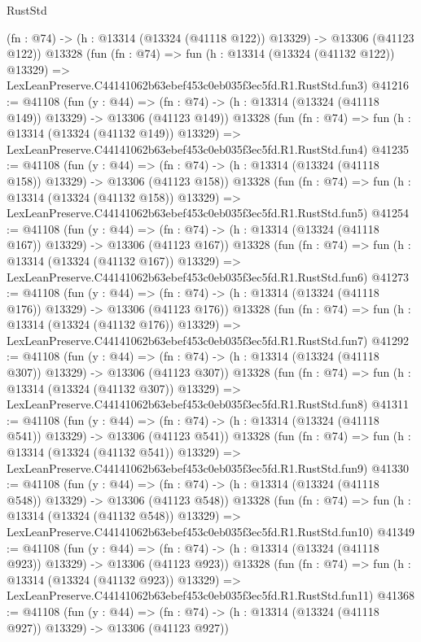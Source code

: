 \begin{lexlean}{RustStd}
\begin{coremodule}
    (fn : @74) -> (h : @13314 (@13324 (@41118 @122)) @13329) -> @13306 (@41123 @122))
    @13328
    (fun (fn : @74) =>
    fun (h : @13314 (@13324 (@41132 @122)) @13329) =>
    LexLeanPreserve.C44141062b63ebef453c0eb035f3ec5fd.R1.RustStd.fun3)
@41216 := @41108
    (fun (y : @44) =>
    (fn : @74) -> (h : @13314 (@13324 (@41118 @149)) @13329) -> @13306 (@41123 @149))
    @13328
    (fun (fn : @74) =>
    fun (h : @13314 (@13324 (@41132 @149)) @13329) =>
    LexLeanPreserve.C44141062b63ebef453c0eb035f3ec5fd.R1.RustStd.fun4)
@41235 := @41108
    (fun (y : @44) =>
    (fn : @74) -> (h : @13314 (@13324 (@41118 @158)) @13329) -> @13306 (@41123 @158))
    @13328
    (fun (fn : @74) =>
    fun (h : @13314 (@13324 (@41132 @158)) @13329) =>
    LexLeanPreserve.C44141062b63ebef453c0eb035f3ec5fd.R1.RustStd.fun5)
@41254 := @41108
    (fun (y : @44) =>
    (fn : @74) -> (h : @13314 (@13324 (@41118 @167)) @13329) -> @13306 (@41123 @167))
    @13328
    (fun (fn : @74) =>
    fun (h : @13314 (@13324 (@41132 @167)) @13329) =>
    LexLeanPreserve.C44141062b63ebef453c0eb035f3ec5fd.R1.RustStd.fun6)
@41273 := @41108
    (fun (y : @44) =>
    (fn : @74) -> (h : @13314 (@13324 (@41118 @176)) @13329) -> @13306 (@41123 @176))
    @13328
    (fun (fn : @74) =>
    fun (h : @13314 (@13324 (@41132 @176)) @13329) =>
    LexLeanPreserve.C44141062b63ebef453c0eb035f3ec5fd.R1.RustStd.fun7)
@41292 := @41108
    (fun (y : @44) =>
    (fn : @74) -> (h : @13314 (@13324 (@41118 @307)) @13329) -> @13306 (@41123 @307))
    @13328
    (fun (fn : @74) =>
    fun (h : @13314 (@13324 (@41132 @307)) @13329) =>
    LexLeanPreserve.C44141062b63ebef453c0eb035f3ec5fd.R1.RustStd.fun8)
@41311 := @41108
    (fun (y : @44) =>
    (fn : @74) -> (h : @13314 (@13324 (@41118 @541)) @13329) -> @13306 (@41123 @541))
    @13328
    (fun (fn : @74) =>
    fun (h : @13314 (@13324 (@41132 @541)) @13329) =>
    LexLeanPreserve.C44141062b63ebef453c0eb035f3ec5fd.R1.RustStd.fun9)
@41330 := @41108
    (fun (y : @44) =>
    (fn : @74) -> (h : @13314 (@13324 (@41118 @548)) @13329) -> @13306 (@41123 @548))
    @13328
    (fun (fn : @74) =>
    fun (h : @13314 (@13324 (@41132 @548)) @13329) =>
    LexLeanPreserve.C44141062b63ebef453c0eb035f3ec5fd.R1.RustStd.fun10)
@41349 := @41108
    (fun (y : @44) =>
    (fn : @74) -> (h : @13314 (@13324 (@41118 @923)) @13329) -> @13306 (@41123 @923))
    @13328
    (fun (fn : @74) =>
    fun (h : @13314 (@13324 (@41132 @923)) @13329) =>
    LexLeanPreserve.C44141062b63ebef453c0eb035f3ec5fd.R1.RustStd.fun11)
@41368 := @41108
    (fun (y : @44) =>
    (fn : @74) -> (h : @13314 (@13324 (@41118 @927)) @13329) -> @13306 (@41123 @927))

\end{coremodule}
\end{lexlean}

